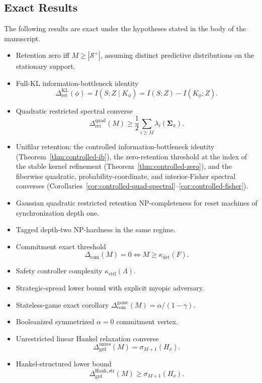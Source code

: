 \documentclass[12pt]{article}
\theoremstyle{definition}
\newcommand{\RetKL}{\Delta_{\mathrm{ret}}^{\mathrm{KL}}}
\newcommand{\RetQuad}{\Delta_{\mathrm{ret}}^{\mathrm{quad}}}
\newcommand{\Dunres}{\Delta_{\mathrm{grd}}^{\mathrm{unres}}}
\newcommand{\DHankstr}{\Delta_{\mathrm{grd}}^{\mathrm{Hank,str}}}
\newcommand{\Com}{\Delta_{\mathrm{com}}}
\newcommand{\ComGame}{\Delta_{\mathrm{com}}^{\mathrm{game}}}
\newcommand{\Splus}{\mathcal S^{+}}
\begin{document}
\subsection{Exact Results}
\label{subsec:exact-results}

The following results are exact under the hypotheses stated in the body of the
manuscript.

\begin{itemize}[leftmargin=1.6em]
\item Retention zero iff $M\ge|\Splus|$, assuming distinct predictive
distributions on the stationary support.
\item Full-KL information-bottleneck identity
\[
\RetKL(\phi)=I(S;Z\mid K_\phi)
=
I(S;Z)-I(K_\phi;Z).
\]
\item Quadratic restricted spectral converse
\[
\RetQuad(M)
\ge
\frac12
\sum_{i\ge M}
\lambda_i(\bm{\Sigma}_\pi).
\]
\item Unifilar retention: the controlled information-bottleneck identity
(Theorem~\ref{thm:controlled-ib}), the zero-retention threshold at the index of
the stable kernel refinement (Theorem~\ref{thm:controlled-zero}), and the
fiberwise quadratic, probability-coordinate, and interior-Fisher spectral
converses
(Corollaries~\ref{cor:controlled-quad-spectral}--\ref{cor:controlled-fisher}).
\item Gaussian quadratic restricted retention NP-completeness for reset
machines of synchronization depth one.
\item Tagged depth-two NP-hardness in the same regime.
\item Commitment exact threshold
\[
\Com(M)=0
\iff
M\ge\kappa_{\det}(F).
\]
\item Safety controller complexity $\kappa_{\mathrm{ctrl}}(\Lambda)$.
\item Strategic-spread lower bound with explicit myopic adversary.
\item Stateless-game exact corollary $\ComGame(M)=\alpha/(1-\gamma)$.
\item Booleanized symmetrized $\alpha=0$ commitment vertex.
\item Unrestricted linear Hankel relaxation converse
\[
\Dunres(M)
=
\sigma_{M+1}(H_\nu).
\]
\item Hankel-structured lower bound
\[
\DHankstr(M)\ge\sigma_{M+1}(H_\nu).
\]


\end{itemize}
\end{document}
